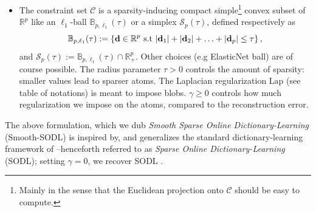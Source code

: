\begin{itemize}
\item The constraint set $\mathcal C$ is a sparsity-inducing compact
simple\footnote{Mainly in the sense that the Euclidean projection onto
$\mathcal C$ should be easy to compute.} convex subset of $\mathbb R^p$
like an $\ell_1$-ball $\mathbb B_{p,\ell_1}(\tau)$ or a simplex $\mathcal S_p(\tau)$, defined respectively as $$\mathbb B_{p,\ell_1}(\tau) := \left\{\mathbf{d} \in \mathbb R^p\text{ s.t }|\mathbf{d}_1| + |\mathbf{d}_2| + \ldots + |\mathbf{d}_p| \le \tau\right\},$$
and
$\mathcal S_p(\tau) := \mathbb B_{p,\ell_1}(\tau) \cap \mathbb R_+^p.$
Other choices (e.g ElasticNet ball) are of course possible. The radius parameter $\tau > 0$ controls the
amount of sparsity: smaller values lead to sparser atoms.
The Laplacian regularization $\text{Lap}$ (see table of notations) is meant to impose blobs.
$\gamma \ge 0$ controls how much regularization we impose on the atoms, compared to the
reconstruction error.

\end{itemize}
The above formulation, which we dub \textit{Smooth Sparse Online Dictionary-Learning} (Smooth-SODL) is inspired by, and generalizes the standard
dictionary-learning framework of   \citep{mairal2010} --henceforth referred to as \textit{Sparse Online Dictionary-Learning} (SODL); setting $\gamma = 0$, we recover SODL   \citep{mairal2010}.


